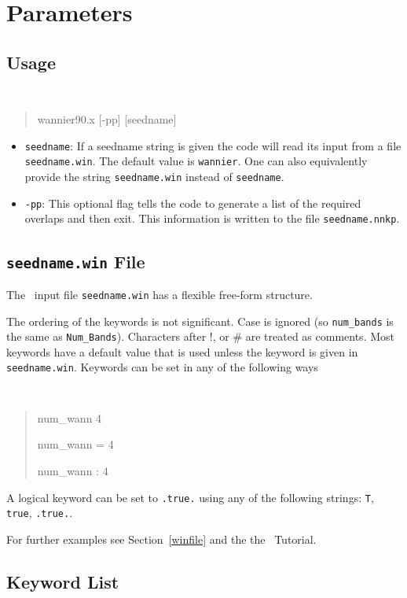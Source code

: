 \chapter{Parameters}\label{chap:parameters}

\section{Usage}
{\tt
\begin{quote}
wannier90.x [-pp] [seedname]
\end{quote} }
\begin{itemize}
\item{ {\tt seedname}: If a seedname string is given the code will read its input
from a file {\tt seedname.win}. The default value is {\tt wannier}. One can also equivalently provide the string
  {\tt seedname.win} instead of  {\tt seedname}.}
\item { {\tt -pp}: This optional flag tells the code to generate
a list of the required overlaps and then exit. 
This information is written to the file {\tt seedname.nnkp}.}
\end{itemize}

\section{{\tt seedname.win} File\label{sec:seednamefile}}
The \wannier\ input file {\tt seedname.win} has a flexible free-form
structure. 

The ordering of the keywords is not significant. Case is ignored (so
\verb#num_bands# is the same as \verb#Num_Bands#). Characters after !, or \#
are treated as comments. Most keywords have a default value that is
used unless the keyword is given in {\tt seedname.win}. Keywords can be set
in any of the following ways
{\tt
\begin{quote}
num\_wann   4

num\_wann = 4

num\_wann : 4
\end{quote} }
A logical keyword can be set to {\tt .true.} using any of the following
strings: {\tt T}, {\tt true}, {\tt .true.}.

For further examples see Section~\ref{winfile} and the the \wannier\ Tutorial.


\section{Keyword List}
\label{parameter_data}

